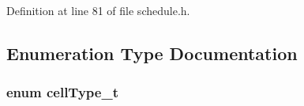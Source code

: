 Definition at line 81 of file schedule.\+h.



\subsection{Enumeration Type Documentation}
\subsubsection[{\texorpdfstring{cell\+Type\+\_\+t}{cellType_t}}]{\setlength{\rightskip}{0pt plus 5cm}enum {\bf cell\+Type\+\_\+t}}\hypertarget{group___schedule_gad8490d4fdf8cef27f7e5fa6a37046a3d}{}\label{group___schedule_gad8490d4fdf8cef27f7e5fa6a37046a3d}
